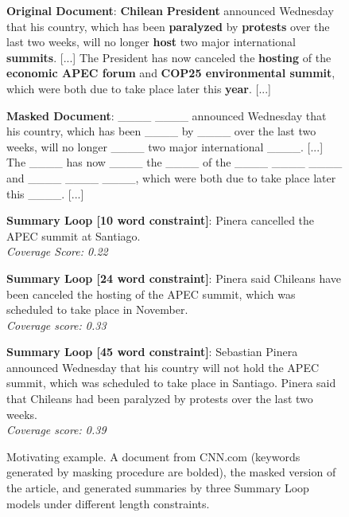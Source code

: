 \documentclass[11pt,a4paper]{article}
\begin{document}
\begin{figure}[th]
    \begin{framed}
        \small
        \textbf{Original Document}: \textbf{Chilean} \textbf{President} announced Wednesday that his country, which has been \textbf{paralyzed} by \textbf{protests} over the last two weeks, will no longer \textbf{host} two major international \textbf{summits}. [...] The President has now canceled the \textbf{hosting} of the \textbf{economic APEC forum} and \textbf{COP25 environmental summit}, which were both due to take place later this \textbf{year}. [...]
        
        \vspace{0.5em}
        \textbf{Masked Document}: \_\_\_\_ \_\_\_\_ announced Wednesday that his country, which has been \_\_\_\_ by \_\_\_\_ over the last two weeks, will no longer \_\_\_\_ two major international \_\_\_\_. [...] The \_\_\_\_ has now \_\_\_\_ the \_\_\_\_ of the \_\_\_\_ \_\_\_\_ \_\_\_\_ and \_\_\_\_ \_\_\_\_ \_\_\_\_, which were both due to take place later this \_\_\_\_. [...]
        
        \vspace{0.5em}
        \textbf{Summary Loop [10 word constraint]}: Pinera cancelled the APEC summit at Santiago.\\ \textit{Coverage Score: 0.22}
        
        \vspace{0.5em}
        \textbf{Summary Loop [24 word constraint]}: Pinera said Chileans have been canceled the hosting of the APEC summit, which was scheduled to take place in November.\\
        \textit{Coverage score: 0.33}
        
        \vspace{0.5em}
        \textbf{Summary Loop [45 word constraint]}: Sebastian Pinera announced Wednesday that his country will not hold the APEC summit, which was scheduled to take place in Santiago. Pinera said that Chileans had been paralyzed by protests over the last two weeks.\\
        \textit{Coverage score: 0.39}  
    \end{framed}
    \vspace{-1em}
    \caption{Motivating example. A document from CNN.com (keywords generated by masking procedure are bolded), the masked version of the article, and generated summaries by three Summary Loop models under different length constraints.}
    \label{fig:coverage_example}
\end{figure}
\end{document}
